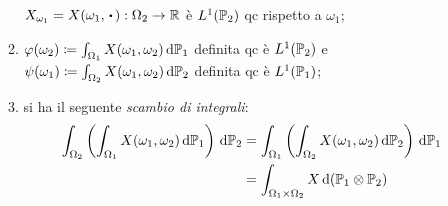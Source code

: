 \begin{teo}
\begin{enumerate}
\begin{enumerate}
      $X_{\omega_1} = X(\omega_1, \, \bigcdot \, ):\Omega_2 \to \RR$ è $L^1(\mathbb P_2)$ qc rispetto a $\omega_1$;
      \item $\varphi(\omega_2) \coloneqq \int_{\Omega_1}X(\omega_1,\omega_2) \, \mathrm d \mathbb P_1$ definita qc è $L^1(\mathbb P_2)$ e\\
      $\psi(\omega_1) \coloneqq \int_{\Omega_2}X(\omega_1,\omega_2) \, \mathrm d \mathbb P_2$ definita qc è $L^1(\mathbb P_1)$;
      \item si ha il seguente \textit{scambio di integrali}:
      \begin{align*}
        \int_{\Omega_2} \left( \int_{\Omega_1}X(\omega_1,\omega_2) \, \mathrm d \mathbb P_1 \right) \, \mathrm d \mathbb P_2
        &=\int_{\Omega_1} \left(\int_{\Omega_2}X(\omega_1,\omega_2) \, \mathrm d \mathbb P_2 \right) \, \mathrm d \mathbb P_1 \\
        &=\int_{\Omega_1 \times \Omega_2}X \, \mathrm d (\mathbb P_1 \otimes \mathbb P_2)
      \end{align*}
      \end{enumerate}
  \end{enumerate}
  \end{teo}

